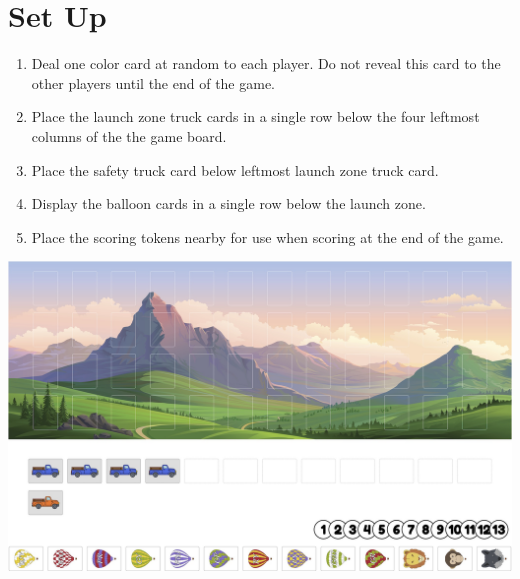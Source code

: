 \documentclass[a6paper, 11pt, parskip=half, DIV=15]{scrartcl}
\begin{document}
\newpage
\enlargethispage{1.75\baselineskip}
\section*{Set Up}
\begin{enumerate}

  \item Deal one color card at random to each player.
  Do not reveal this card to the other players until the end of the game.

 
  \item Place the launch zone truck cards in a single row below the four leftmost columns of the the game board.%

  \item Place the safety truck card below leftmost launch zone truck card.


  \item Display the balloon cards in a single row below the launch zone. 

  \item Place the scoring tokens nearby for use when scoring at the end of the game.
\end{enumerate}
\begin{center}
\includegraphics[scale=0.105]{set_up_diagram.jpg}
\end{center}
\end{document}
